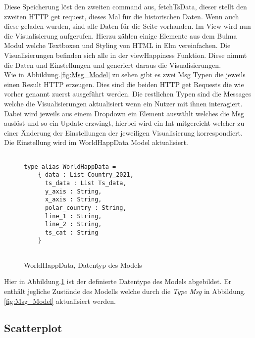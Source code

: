 Diese Speicherung löst den zweiten command aus, fetchTsData, dieser stellt den zweiten HTTP get request, dieses Mal für die historischen Daten. Wenn auch diese geladen wurden, sind alle Daten für die Seite vorhanden. Im View wird nun die Visualisierung aufgerufen. Hierzu zählen einige Elemente aus dem Bulma Modul\cite{elm-bulma} welche Textboxen und Styling von HTML in Elm vereinfachen. Die Visualisierungen befinden sich alle in der viewHappiness Funktion. Diese nimmt die Daten und Einstellungen und generiert daraus die Visualisierungen. \\


Wie in  Abbildung.\ref{fig:Msg_Model} zu sehen gibt es zwei Msg Typen die jeweils einen Result HTTP erzeugen. Dies sind die beiden HTTP get Requests die wie vorher genannt zuerst ausgeführt werden. Die restlichen Typen sind die Messages welche die Visualisierungen aktualisiert wenn ein Nutzer mit ihnen interagiert. Dabei wird jeweils aus einem Dropdown ein Element auswählt welches die Msg auslöst und so ein Update erzwingt, hierbei wird ein Int mitgereicht welcher zu einer Änderung der Einstellungen der jeweiligen Visualisierung korrespondiert. Die Einstellung wird im WorldHappData Model aktualisiert. \\

\begin{figure}[ht]
\centering
\begin{mdframed}[backgroundcolor=backcolour]
\begin{verbatim}

type alias WorldHappData = 
    { data : List Country_2021,
      ts_data : List Ts_data,
      y_axis : String,
      x_axis : String,
      polar_country : String,
      line_1 : String,
      line_2 : String,
      ts_cat : String
    }
  
\end{verbatim}
\end{mdframed}
    \caption{WorldHappData, Datentyp des Models}
    \label{fig:Worldhapp}
\end{figure}

Hier in Abbildung.\ref{fig:Worldhapp} ist der definierte Datentype des Models abgebildet. Er enthält jegliche Zustände des Modells welche durch die \textit{Type Msg} in Abbildung.\ref{fig:Msg_Model} aktualisiert werden. \\

\newpage
\subsection{Scatterplot}


